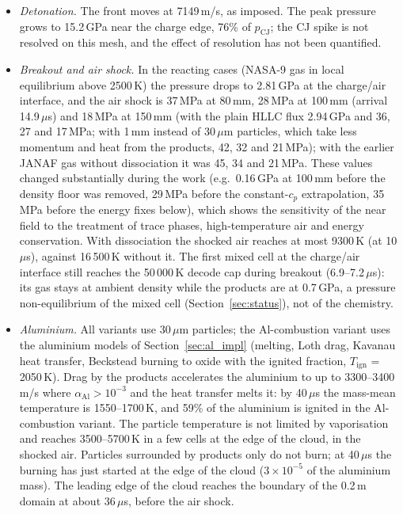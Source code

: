 \documentclass{article}
\begin{document}
\begin{itemize}
    \item \emph{Detonation.} The front moves at 7149\,m/s, as imposed. The peak pressure grows to 15.2\,GPa near the charge edge, 76\% of $p_\text{CJ}$; the CJ spike is not resolved on this mesh, and the effect of resolution has not been quantified.
    \item \emph{Breakout and air shock.} In the reacting cases (NASA-9 gas in local equilibrium above 2500\,K) the pressure drops to 2.81\,GPa at the charge/air interface, and the air shock is 37\,MPa at 80\,mm, 28\,MPa at 100\,mm (arrival 14.9\,$\mu$s) and 18\,MPa at 150\,mm (with the plain HLLC flux 2.94\,GPa and 36, 27 and 17\,MPa; with 1\,mm instead of 30\,$\mu$m particles, which take less momentum and heat from the products, 42, 32 and 21\,MPa); with the earlier JANAF gas without dissociation it was 45, 34 and 21\,MPa. These values changed substantially during the work (e.g.\ 0.16\,GPa at 100\,mm before the density floor was removed, 29\,MPa before the constant-$c_p$ extrapolation, 35\,MPa before the energy fixes below), which shows the sensitivity of the near field to the treatment of trace phases, high-temperature air and energy conservation. With dissociation the shocked air reaches at most 9300\,K (at 10\,$\mu$s), against 16\,500\,K without it. The first mixed cell at the charge/air interface still reaches the 50\,000\,K decode cap during breakout (6.9--7.2\,$\mu$s): its gas stays at ambient density while the products are at 0.7\,GPa, a pressure non-equilibrium of the mixed cell (Section~\ref{sec:status}), not of the chemistry.
    \item \emph{Aluminium.} All variants use 30\,$\mu$m particles; the Al-combustion variant uses the aluminium models of Section~\ref{sec:al_impl} (melting, Loth drag, Kavanau heat transfer, Beckstead burning to oxide with the ignited fraction, $T_\text{ign}$ = 2050\,K). Drag by the products accelerates the aluminium to up to 3300--3400\,m/s where $\alpha_\text{Al} > 10^{-3}$ and the heat transfer melts it: by 40\,$\mu$s the mass-mean temperature is 1550--1700\,K, and 59\% of the aluminium is ignited in the Al-combustion variant. The particle temperature is not limited by vaporisation and reaches 3500--5700\,K in a few cells at the edge of the cloud, in the shocked air. Particles surrounded by products only do not burn; at 40\,$\mu$s the burning has just started at the edge of the cloud ($3\times10^{-5}$ of the aluminium mass). The leading edge of the cloud reaches the boundary of the 0.2\,m domain at about 36\,$\mu$s, before the air shock.

\end{itemize}
\end{document}
